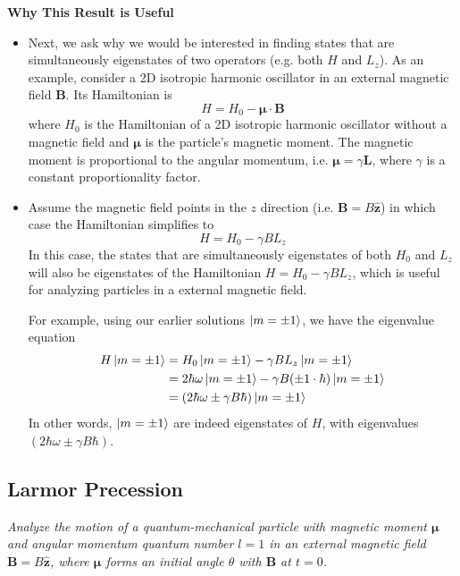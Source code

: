 \documentclass[11pt, a4paper]{article}
\renewcommand{\vec}[1]{\bm{#1}} %
\newcommand{\uvec}[1]{\hat{\vec{#1}}} %
\begin{document}
\textbf{Why This Result is Useful}\\
\begin{itemize}
	\item Next, we ask why we would be interested in finding states that are simultaneously eigenstates of two operators (e.g. both $ H $ and $ L_{z} $). As an example, consider a 2D isotropic harmonic oscillator in an external magnetic field $ \vec{B} $. Its Hamiltonian is
	\begin{equation*}
		H = H_{0} - \vec{\mu} \cdot \vec{B}
	\end{equation*}
	where $ H_{0} $ is the Hamiltonian of a 2D isotropic harmonic oscillator without a magnetic field and $ \vec{\mu} $ is the particle's magnetic moment. The magnetic moment is proportional to the angular momentum, i.e. $ \vec{\mu} = \gamma \vec{L} $, where $ \gamma $ is a constant proportionality factor.
	
	\item Assume the magnetic field points in the $ z $ direction (i.e. $ \vec{B} = B \uvec{z} $) in which case the Hamiltonian simplifies to
	\begin{equation*}
		H = H_{0} - \gamma B L_{z}
	\end{equation*}
	In this case, the states that are simultaneously eigenstates of both $ H_{0} $ and $ L_{z} $ will also be eigenstates of the Hamiltonian $ H = H_{0} - \gamma B L_{z}$, which is useful for analyzing particles in  a external magnetic field. 
	
	For example, using our earlier solutions $ \ket{m = \pm 1} $, we have the eigenvalue equation
	\begin{align*}
		H \ket{m = \pm 1} &= H_{0}\ket{m = \pm 1} - \gamma B L_{z} \ket{m = \pm 1} \\
		& = 2\hbar \omega \ket{m = \pm 1} - \gamma B (\pm 1 \cdot \hbar)\ket{m = \pm 1} \\
		&= (2\hbar \omega \pm \gamma B\hbar)\ket{m = \pm 1}
	\end{align*}
	In other words, $ \ket{m = \pm 1} $ are indeed eigenstates of $ H $, with eigenvalues $ (2\hbar \omega \pm \gamma B\hbar) $.
\end{itemize}


\subsection{Larmor Precession}
\textit{Analyze the motion of a quantum-mechanical particle with magnetic moment $ \vec{\mu} $ and angular momentum quantum number $ l = 1 $ in an external magnetic field $ \vec{B} = B\uvec{z} $, where $ \vec{\mu} $ forms an initial angle $ \theta $ with $ \vec{B} $ at $ t = 0 $.}
\end{document}
